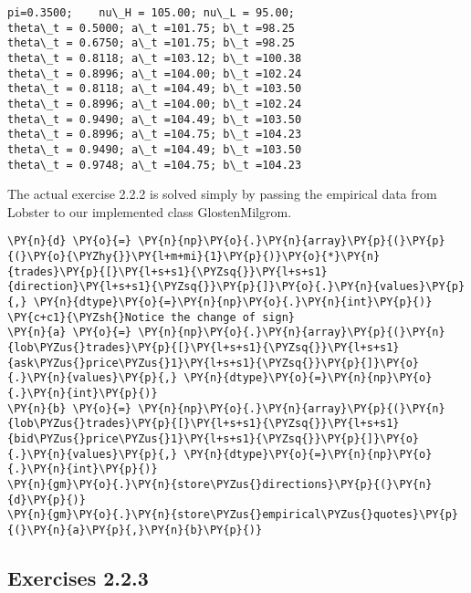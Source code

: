 \documentclass[9pt]{article}
\begin{document}
    \begin{Verbatim}[commandchars=\\\{\}]
pi=0.3500;    nu\_H = 105.00; nu\_L = 95.00;
theta\_t = 0.5000; a\_t =101.75; b\_t =98.25
theta\_t = 0.6750; a\_t =101.75; b\_t =98.25
theta\_t = 0.8118; a\_t =103.12; b\_t =100.38
theta\_t = 0.8996; a\_t =104.00; b\_t =102.24
theta\_t = 0.8118; a\_t =104.49; b\_t =103.50
theta\_t = 0.8996; a\_t =104.00; b\_t =102.24
theta\_t = 0.9490; a\_t =104.49; b\_t =103.50
theta\_t = 0.8996; a\_t =104.75; b\_t =104.23
theta\_t = 0.9490; a\_t =104.49; b\_t =103.50
theta\_t = 0.9748; a\_t =104.75; b\_t =104.23
    \end{Verbatim}

    The actual exercise 2.2.2 is solved simply by passing the empirical data
from Lobster to our implemented class GlostenMilgrom.

    \begin{tcolorbox}[breakable, size=fbox, boxrule=1pt, pad at break*=1mm,colback=cellbackground, colframe=cellborder]
\begin{Verbatim}[commandchars=\\\{\}]
\PY{n}{d} \PY{o}{=} \PY{n}{np}\PY{o}{.}\PY{n}{array}\PY{p}{(}\PY{p}{(}\PY{o}{\PYZhy{}}\PY{l+m+mi}{1}\PY{p}{)}\PY{o}{*}\PY{n}{trades}\PY{p}{[}\PY{l+s+s1}{\PYZsq{}}\PY{l+s+s1}{direction}\PY{l+s+s1}{\PYZsq{}}\PY{p}{]}\PY{o}{.}\PY{n}{values}\PY{p}{,} \PY{n}{dtype}\PY{o}{=}\PY{n}{np}\PY{o}{.}\PY{n}{int}\PY{p}{)} \PY{c+c1}{\PYZsh{}Notice the change of sign}
\PY{n}{a} \PY{o}{=} \PY{n}{np}\PY{o}{.}\PY{n}{array}\PY{p}{(}\PY{n}{lob\PYZus{}trades}\PY{p}{[}\PY{l+s+s1}{\PYZsq{}}\PY{l+s+s1}{ask\PYZus{}price\PYZus{}1}\PY{l+s+s1}{\PYZsq{}}\PY{p}{]}\PY{o}{.}\PY{n}{values}\PY{p}{,} \PY{n}{dtype}\PY{o}{=}\PY{n}{np}\PY{o}{.}\PY{n}{int}\PY{p}{)}
\PY{n}{b} \PY{o}{=} \PY{n}{np}\PY{o}{.}\PY{n}{array}\PY{p}{(}\PY{n}{lob\PYZus{}trades}\PY{p}{[}\PY{l+s+s1}{\PYZsq{}}\PY{l+s+s1}{bid\PYZus{}price\PYZus{}1}\PY{l+s+s1}{\PYZsq{}}\PY{p}{]}\PY{o}{.}\PY{n}{values}\PY{p}{,} \PY{n}{dtype}\PY{o}{=}\PY{n}{np}\PY{o}{.}\PY{n}{int}\PY{p}{)}
\PY{n}{gm}\PY{o}{.}\PY{n}{store\PYZus{}directions}\PY{p}{(}\PY{n}{d}\PY{p}{)}
\PY{n}{gm}\PY{o}{.}\PY{n}{store\PYZus{}empirical\PYZus{}quotes}\PY{p}{(}\PY{n}{a}\PY{p}{,}\PY{n}{b}\PY{p}{)}
\end{Verbatim}
\end{tcolorbox}

    \hypertarget{exercises-2.2.3}{%
\subsection*{Exercises 2.2.3}\label{exercises-2.2.3}}
\end{document}
